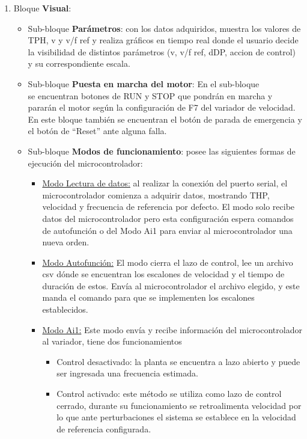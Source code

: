 \begin{enumerate}
\item Bloque \textbf{Visual}: 
\begin{itemize}
\item Sub-bloque \textbf{Parámetros}: con los datos adquiridos, muestra los valores de TPH, v y v/f ref y realiza gráficos en tiempo real donde el usuario decide la visibilidad de distintos parámetros (v, v/f ref, dDP, accion de control) y su correspondiente escala. 
\item Sub-bloque \textbf{Puesta en marcha del motor}: En el sub-bloque \\  se encuentran botones de RUN y STOP que pondrán en marcha y pararán el motor según la configuración de F7 del variador de velocidad. En este bloque también se encuentran el botón de parada de emergencia y el botón de “Reset” ante alguna falla. 
\item Sub-bloque \textbf{Modos de funcionamiento}: posee las siguientes formas de ejecución del microcontrolador:
\begin{itemize}
\item \underline{Modo Lectura de datos:} al realizar la conexión del puerto serial, el microcontrolador comienza a adquirir datos, mostrando THP, velocidad y frecuencia de referencia por defecto. El modo solo recibe datos del microcontrolador pero esta configuración espera comandos de autofunción o del Modo Ai1 para enviar al microcontrolador una nueva orden.
\item \underline{Modo Autofunción:} El modo cierra el lazo de control, lee un archivo csv dónde se encuentran los escalones de velocidad y el tiempo de duración de estos. Envía al microcontrolador el archivo elegido, y este manda el comando para que se implementen los escalones establecidos.
\item \underline{Modo Ai1:} Este modo envía y recibe información del microcontrolador al variador, tiene dos funcionamientos
\begin{itemize}
\item Control desactivado: la planta se encuentra a lazo abierto y puede ser ingresada una frecuencia estimada.
\item Control activado: este método se utiliza como lazo de control cerrado, durante su funcionamiento se retroalimenta velocidad por lo que ante perturbaciones el sistema se establece en la velocidad de referencia configurada.
\end{itemize}
\end{itemize}
\end{itemize}

\end{enumerate}





